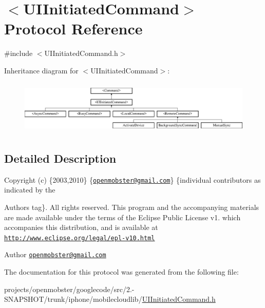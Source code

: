 \hypertarget{protocol_u_i_initiated_command-p}{
\section{$<$\-U\-I\-Initiated\-Command$>$ \-Protocol \-Reference}
\label{protocol_u_i_initiated_command-p}
}


{\ttfamily \#include $<$\-U\-I\-Initiated\-Command.\-h$>$}

\-Inheritance diagram for $<$\-U\-I\-Initiated\-Command$>$\-:\begin{figure}[H]
\begin{center}
\leavevmode
\includegraphics[height=2.604651cm]{protocol_u_i_initiated_command-p}
\end{center}
\end{figure}


\subsection{\-Detailed \-Description}
\-Copyright (c) \{2003,2010\} \{\href{mailto:openmobster@gmail.com}{\tt openmobster@gmail.\-com}\} \{individual contributors as indicated by the \begin{DoxyAuthor}{\-Authors}
tag\}. \-All rights reserved. \-This program and the accompanying materials are made available under the terms of the \-Eclipse \-Public \-License v1. which accompanies this distribution, and is available at \href{http://www.eclipse.org/legal/epl-v10.html}{\tt http\-://www.\-eclipse.\-org/legal/epl-\/v10.\-html}
\end{DoxyAuthor}
\begin{DoxyAuthor}{\-Author}
\href{mailto:openmobster@gmail.com}{\tt openmobster@gmail.\-com} 
\end{DoxyAuthor}


\-The documentation for this protocol was generated from the following file\-:\begin{DoxyCompactItemize}
\item 
projects/openmobster/googlecode/src/2.-\/\-S\-N\-A\-P\-S\-H\-O\-T/trunk/iphone/mobilecloudlib/\hyperlink{_u_i_initiated_command_8h}{\-U\-I\-Initiated\-Command.\-h}\end{DoxyCompactItemize}
